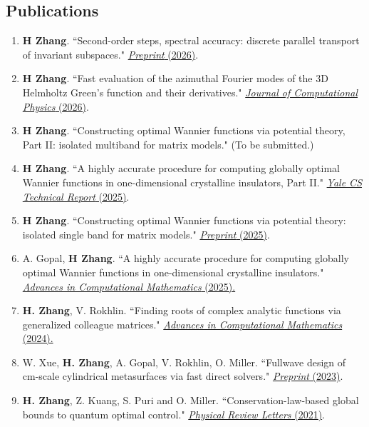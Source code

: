 \documentclass[margin,line,pifont,palatino,courier]{res}
\begin{document}
\begin{resume}
\section{\sc Publications}
\begin{enumerate}
\setlength\itemsep{0em}
	\item{\textbf{H Zhang}. ``Second-order steps, spectral accuracy: discrete parallel transport of invariant subspaces." \href{https://arxiv.org/abs/2610.34494}{\color{blue} \emph{Preprint} (2026)}.}
	\item{\textbf{H Zhang}. ``Fast evaluation of the azimuthal Fourier modes of the 3D Helmholtz Green's function and their derivatives." \href{https://doi.org/10.1016/j.jcp.2026.115464}{\color{blue} \emph{Journal of Computational Physics} (2026)}.}
	\item{\textbf{H Zhang}. ``Constructing optimal Wannier functions via potential theory,\\ Part II: isolated multiband for matrix models." (To be submitted.) }
	\item{ \textbf{H Zhang}. ``A highly accurate procedure for computing globally optimal Wannier functions in one-dimensional crystalline insulators, Part II." \href{https://engineering.yale.edu/application/files/2817/6303/9480/TR1575.pdf}{\color{blue} \emph{Yale CS Technical Report } (2025)}. }
	\item{\textbf{H Zhang}. ``Constructing optimal Wannier functions via potential theory: isolated single band for matrix models." \href{https://arxiv.org/abs/2502.08641}{\color{blue} \emph{Preprint} (2025)}.}
	\item{A. Gopal, \textbf{H Zhang}. ``A highly accurate procedure for computing globally optimal Wannier functions in one-dimensional crystalline insulators." \href{https://link.springer.com/article/10.1007/s10444-025-10266-4}{\color{blue}  \emph{Advances in Computational Mathematics} (2025).}}
	\item \textbf{H. Zhang}, V. Rokhlin. ``Finding roots of complex analytic functions via generalized colleague matrices." \href{https://link.springer.com/article/10.1007/s10444-024-10174-z}{\color{blue}  \emph{Advances in Computational Mathematics} (2024).}
	\item W. Xue, \textbf{H. Zhang}, A. Gopal, V. Rokhlin, O. Miller. ``Fullwave design of cm-scale cylindrical metasurfaces via fast direct solvers." \href{https://arxiv.org/abs/2308.08569}{\color{blue} \emph{Preprint} (2023)}.
	\item{\textbf{H. Zhang}, Z. Kuang, S. Puri and O. Miller. ``Conservation-law-based global bounds to quantum optimal control." \href{https://journals.aps.org/prl/abstract/10.1103/PhysRevLett.127.110506}{\color{blue} \emph{Physical Review Letters} (2021)}.}

\end{enumerate}
\end{resume}
\end{document}
